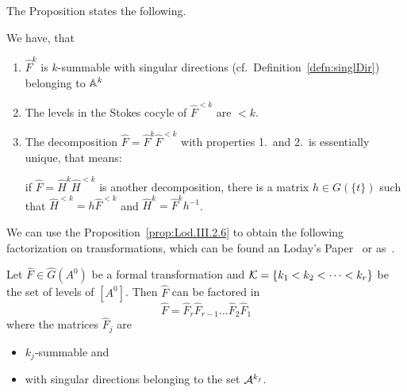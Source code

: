 The Proposition \cite[Prop.III.2.6]{Loday1994} states the following.
\begin{prop}\label{prop:Lod.III.2.6}
  We have, that
  \begin{enumerate}
    \item $\hat F^k$ is $k$-summable with singular directions
      (cf.\ Definition~\ref{defn:singlDir}) belonging to
      $\mathbb{A}^k$
    \item The levels in the Stokes cocyle of $\hat F^{<k}$ are $<k$.
    \item The decomposition $\hat F=\hat F^{k}\hat F^{<k}$ with properties 1.\
      and 2.\ is essentially unique, that means:
      \begin{einr}
        if $\hat F=\hat H^k\hat H^{<k}$ is another decomposition, there is a
        matrix $h\in G(\!\{t\}\!)$ such that $\hat H^{<k}=h\hat F^{<k}$ and
        $\hat H^{k}=\hat F^{k}h^{-1}$.
      \end{einr}
  \end{enumerate}
\end{prop}
\begin{comment}
  \begin{proof}
    The first property \PROBLEM

    The property 2.\ is clear, \rewrite{since larger levels would require more
    singular directions}.

    The property 3.\ results from the fact that we must have
    \[
      \exp_{A^0}(\hat H^{<k})=\exp_{A^0}(\hat F^{<k}).
    \]
  \end{proof}
\end{comment}
We can use the Proposition~\ref{prop:Lod.III.2.6} to obtain the following
factorization on transformations, which can be found an Loday's
Paper~\cite[Thm.III.2.5]{Loday1994} or as~\cite[Thm.4.7]{Martinet1991}.
\begin{thm}\label{thm:summaFaktori}
  Let $\hat F\in\hat G(A^0)$ be a formal transformation and
  $\mathcal{K}=\{k_1<k_2<\cdots<k_r\}$ be the set of levels of $[A^0]$. Then $\hat F$
  can be factored in
  \[
    \hat F=\hat F_r\hat F_{r-1}\dots\hat F_2\hat F_1
  \]
  where the matrices $\hat F_j$ are
  \begin{itemize}
    \item $k_j$-summable and
    \item with singular directions belonging to the set $\mathcal{A}^{k_j}$.
  \end{itemize}
\end{thm}

